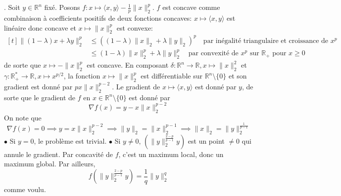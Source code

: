 \documentclass{report}
\begin{document}
\subsection{} \noindent{}\\ 
\\ 
\\
. Soit $y\in \mathbb R^n$ fixé. Posons $f:x\mapsto \langle x,y\rangle - \frac 1p \|x\|_2^p$.  $f$ est concave comme combinaison à coefficients positifs de deux fonctions concaves: $x\mapsto \langle x,y\rangle$ est linéaire donc concave et $x\mapsto \|x\|_2^p$ est convexe: $$\begin{aligned}[t]
\|(1-\lambda)x + \lambda y\|_2^p &\leq \left( (1-\lambda)\|x\|_2 + \lambda \|y\|_2\right)^p \quad \text{par inégalité triangulaire et croissance de } x^p\\
&\leq (1-\lambda)\|x\|_2^p + \lambda \|y\|_2^p \quad \text{par convexité de }x^p \text{  sur }\mathbb R_+ \text{ pour }x\geq 0
\end{aligned}$$
de sorte que $x\mapsto -\|x\|_2^p$ est concave.\newline
\newline
En composant $\delta:\mathbb R^n \to \mathbb R, x \mapsto \|x\|_2^2$ et $\gamma:\mathbb R_+^*\to \mathbb R, x\mapsto x^{p/2} $, la fonction $x\mapsto \|x\|_2^p$ est différentiable sur $\mathbb R^n \setminus \{0\}$ et son gradient est donné par $px \|x\|_2^{p-2}$. \newline
Le gradient de $x\mapsto \langle x, y\rangle $ est donné par $y$, de sorte que le gradient de $f$ en $x \in \mathbb R^n \setminus \{0\}$ est donné par $$\nabla f (x) = y-x \|x\|_2^{p-2}$$
On note que $$\nabla f (x) = 0 \implies y=x \|x\|_2^{p-2} \implies \|y\|_2 = \|x\|_2^{p-1} \implies \|x\|_2= \|y\|_2^{\frac{1}{p-1}} $$
$\bullet$ Si $y=0$, le problème est trivial.\newline 
$\bullet $ Si $y\neq 0$, $\left( \|y\|_2^{\frac{2-p}{p-1}}y\right) $ est un point $\neq 0$ qui annule le gradient. Par concavité de $f$, c'est un maximum local, donc un maximum global. Par ailleurs, $$f(\|y\|_2^{\frac{2-p}{p-1}}y) = \frac{1}{q}\|y\|_2^q$$ comme voulu.\newline
\end{document}
